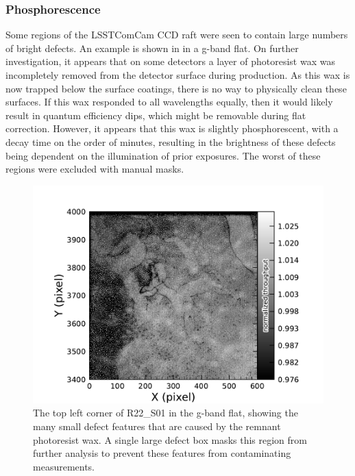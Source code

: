 \subsubsection{Phosphorescence}
Some regions of the LSSTComCam CCD raft were seen to contain large numbers of bright defects.
An example is shown in   in a g-band flat. 
On further investigation, it appears that on some detectors a layer of photoresist wax was incompletely removed from the detector surface during production.
As this wax is now trapped below the surface coatings, there is no way to physically clean these surfaces.
If this wax responded to all wavelengths equally, then it would likely result in quantum efficiency dips, which might be removable during flat correction.
However, it appears that this wax is slightly phosphorescent, with a decay time on the order of minutes, resulting in the brightness of these defects being dependent on the illumination of prior exposures.
The worst of these regions were excluded with manual masks.
\begin{figure}[htb!]
  \centering
  \includegraphics[width=0.98\linewidth]{dp1_isr_anomalies-phosphorescence}
  \caption{The top left corner of R22\_S01 in the g-band flat, showing the many small defect features that are caused by the remnant photoresist wax.
  A single large defect box masks this region from further analysis to prevent these features from contaminating measurements.}
  \label{fig:anomalies_phosphorescence}
\end{figure}

